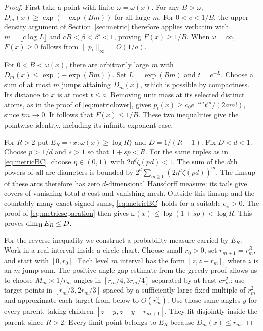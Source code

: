\documentclass[11pt]{article}
\theoremstyle{remark}\newtheorem{remark}[theorem]{Remark}
\begin{document}
\begin{proof}
First take a point with finite $\omega=\omega(x)$. For any $B>\omega$,
$D_m(x)\ge\exp(-\exp(Bm))$ for all large $m$. For $0<c<1/B$, the
upper-density argument of Section~\ref{sec:metric} therefore applies
verbatim with $m=\lfloor c\log L\rfloor$ and
$cB<\beta<\beta'<1$, proving $F(x)\ge 1/B$. When $\omega=\infty$,
$F(x)\ge0$ follows from $\|p_t\|_\infty=O(1/a)$.

For $0<B<\omega(x)$, there are arbitrarily large $m$ with
$D_m(x)\le\exp(-\exp(Bm))$. Set $L=\exp(Bm)$ and $t=e^{-L}$.
Choose a sum of at most $m$ jumps attaining $D_m(x)$, which is possible
by compactness. Its distance to $x$ is at most $t\le a$. Removing unit
mass at its selected distinct atoms, as in the proof of
\eqref{eq:metriclower}, gives $p_t(x)\ge c_0e^{-tm}t^m/(2a m!)$,
since $tm\to0$. It follows that $F(x)\le1/B$. These two inequalities
give the pointwise identity, including its infinite-exponent case.

For $R>2$ put $E_R=\{x:\omega(x)\ge\log R\}$ and $D=1/(R-1)$.
Fix $D<d<1$. Choose $p>1/d$ and $s>1$ so that $1+sp<R$.
For the same tuples as in \eqref{eq:metricBC}, choose
$\eta\in(0,1)$ with $2\eta^d\zeta(pd)<1$. The sum of the $d$th
powers of all arc diameters is bounded by
$2^d\sum_{m\ge0}(2\eta^d\zeta(pd))^m$. The limsup of these arcs
therefore has zero $d$-dimensional Hausdorff measure: its tails
give covers of vanishing total $d$-cost and vanishing mesh. Outside
this limsup and the countably many exact signed sums,
\eqref{eq:metricBC} holds for a suitable $c_x>0$. The proof of
\eqref{eq:metricseparation} then gives
$\omega(x)\le\log(1+sp)<\log R$. This proves $\dim_{\rm H}E_R\le D$.

For the reverse inequality we construct a probability measure carried
by $E_R$. Work in a real interval inside a circle chart. Choose small
$r_0>0$, set $r_{m+1}=r_m^R$, and start with $[0,r_0]$.
Each level $m$ interval has the form $[z,z+r_m]$, where $z$ is an
$m$-jump sum. The positive-angle gap estimate from the greedy proof
allows us to choose $M_m\asymp 1/r_m$ angles in
$[r_m/4,3r_m/4]$ separated by at least $c r_m^2$: use target points
in $[r_m/3,2r_m/3]$ spaced by a sufficiently large fixed multiple of
$r_m^2$ and approximate each target from below to $O(r_m^2)$.
Use those same angles $y$ for every parent, taking children
$[z+y,z+y+r_{m+1}]$. They fit disjointly inside the parent, since
$R>2$. Every limit point belongs to $E_R$ because $D_m(x)\le r_m$.


\end{proof}
\end{document}
